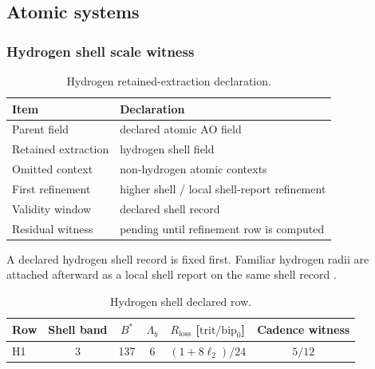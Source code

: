 \subsection{Atomic systems}

\subsubsection{Hydrogen shell scale witness}
\label{man:hydrogen-shell-scale-witness}

\begin{table}[H]
\centering
\caption{Hydrogen retained-extraction declaration.}
\label{tab:hydrogen-retention}
\begin{threeparttable}
\begin{tabularx}{\linewidth}{@{}lX@{}}
\toprule
Item & Declaration \\
\midrule
Parent field & declared atomic AO field \\
Retained extraction & hydrogen shell field \\
Omitted context & non-hydrogen atomic contexts \\
First refinement & higher shell / local shell-report refinement \\
Validity window & declared shell record \\
Residual witness & pending until refinement row is computed \\
\bottomrule
\end{tabularx}
\end{threeparttable}
\end{table}

A declared hydrogen shell record is fixed first. Familiar hydrogen radii are attached afterward as a local shell report on the same shell record \cite{aod43_main_2026}.

\begin{table}[H]
\centering
\caption{Hydrogen shell declared row.}
\label{tab:hydrogen-shell-row}
\begin{threeparttable}
\small
\begin{tabularx}{\linewidth}{@{}lccccc@{}}
\toprule
Row & Shell band & $B^*$ & $\Lambda_b$ & $R_{\mathrm{loss}}$ [\(\mathrm{trit}/\mathrm{bip}_0\)] & Cadence witness \\
\midrule
H1 & 3 & 137 & 6 & $(1+8\ell_2)/24$ & $5/12$ \\
\bottomrule
\end{tabularx}
\end{threeparttable}
\end{table}

